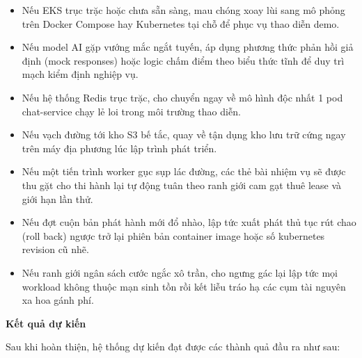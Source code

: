\begin{itemize}
\tightlist
\item
  Nếu EKS trục trặc hoặc chưa sẵn sàng, mau chóng xoay lùi sang mô phỏng
  trên Docker Compose hay Kubernetes tại chỗ để phục vụ thao diễn demo.
\item
  Nếu model AI gặp vướng mắc ngắt tuyến, áp dụng phương thức phản hồi
  giả định (mock responses) hoặc logic chấm điểm theo biểu thức tĩnh để
  duy trì mạch kiểm định nghiệp vụ.
\item
  Nếu hệ thống Redis trục trặc, cho chuyển ngay về mô hình độc nhất 1
  pod chat-service chạy lẻ loi trong môi trường thao diễn.
\item
  Nếu vạch đường tới kho S3 bế tắc, quay về tận dụng kho lưu trữ cứng
  ngay trên máy địa phương lúc lập trình phát triển.
\item
  Nếu một tiến trình worker gục sụp lác đường, các thẻ bài nhiệm vụ sẽ
  được thu gặt cho thi hành lại tự động tuân theo ranh giới cam gạt thuê
  lease và giới hạn lần thử.
\item
  Nếu đợt cuộn bản phát hành mới đổ nhào, lập tức xuất phát thủ tục rút
  chao (roll back) ngược trở lại phiên bản container image hoặc số
  kubernetes revision cũ nhẽ.
\item
  Nếu ranh giới ngân sách cước ngắc xô trần, cho ngưng gác lại lập tức
  mọi workload không thuộc mạn sinh tồn rồi kết liễu tráo hạ các cụm tài
  nguyên xa hoa gánh phí.
\end{itemize}

\vspace{0.5em}\noindent\textbf{Kết quả dự kiến}\par

Sau khi hoàn thiện, hệ thống dự kiến đạt được các thành quả đầu ra như
sau:

